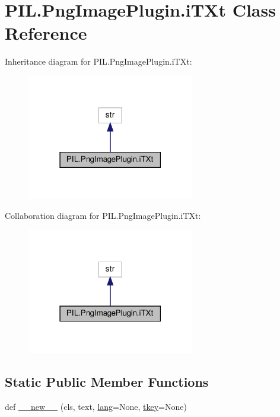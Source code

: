 \hypertarget{classPIL_1_1PngImagePlugin_1_1iTXt}{}\section{P\+I\+L.\+Png\+Image\+Plugin.\+i\+T\+Xt Class Reference}
\label{classPIL_1_1PngImagePlugin_1_1iTXt}


Inheritance diagram for P\+I\+L.\+Png\+Image\+Plugin.\+i\+T\+Xt\+:
\nopagebreak
\begin{figure}[H]
\begin{center}
\leavevmode
\includegraphics[width=207pt]{classPIL_1_1PngImagePlugin_1_1iTXt__inherit__graph}
\end{center}
\end{figure}


Collaboration diagram for P\+I\+L.\+Png\+Image\+Plugin.\+i\+T\+Xt\+:
\nopagebreak
\begin{figure}[H]
\begin{center}
\leavevmode
\includegraphics[width=207pt]{classPIL_1_1PngImagePlugin_1_1iTXt__coll__graph}
\end{center}
\end{figure}
\subsection*{Static Public Member Functions}
\begin{DoxyCompactItemize}
\item 
def \hyperlink{classPIL_1_1PngImagePlugin_1_1iTXt_ad03eceb05617b3f35549673beacf1c0c}{\+\_\+\+\_\+new\+\_\+\+\_\+} (cls, text, \hyperlink{classPIL_1_1PngImagePlugin_1_1iTXt_a26a77c7ee5ba643dc915450436608f70}{lang}=None, \hyperlink{classPIL_1_1PngImagePlugin_1_1iTXt_aefb8b1e34bfb151cded82c8795bac2a8}{tkey}=None)
\end{DoxyCompactItemize}

